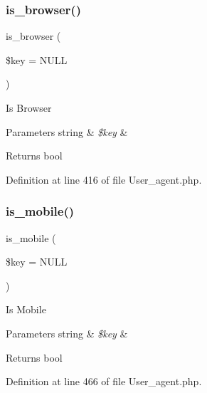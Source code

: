 \subsubsection{\texorpdfstring{is\_browser()}{is\_browser()}}
{\footnotesize\ttfamily is\+\_\+browser (\begin{DoxyParamCaption}\item[{}]{\$key = {\ttfamily NULL} }\end{DoxyParamCaption})}

Is Browser


\begin{DoxyParams}[1]{Parameters}
string & {\em \$key} & \\
\hline
\end{DoxyParams}
\begin{DoxyReturn}{Returns}
bool 
\end{DoxyReturn}


Definition at line 416 of file User\+\_\+agent.\+php.

\mbox{\label{class_c_i___user__agent_ab0ec0b7f6a5eeaf00e35743c25e68dfe}} 
\subsubsection{\texorpdfstring{is\_mobile()}{is\_mobile()}}
{\footnotesize\ttfamily is\+\_\+mobile (\begin{DoxyParamCaption}\item[{}]{\$key = {\ttfamily NULL} }\end{DoxyParamCaption})}

Is Mobile


\begin{DoxyParams}[1]{Parameters}
string & {\em \$key} & \\
\hline
\end{DoxyParams}
\begin{DoxyReturn}{Returns}
bool 
\end{DoxyReturn}


Definition at line 466 of file User\+\_\+agent.\+php.

\mbox{\label{class_c_i___user__agent_ab2ec679c069f45c4265dade1e1097f17}} 
